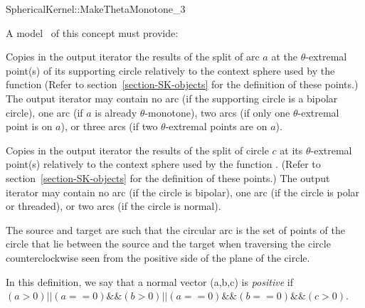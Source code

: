 {\color{cyan} %
\begin{ccRefFunctionObjectConcept}{SphericalKernel::MakeThetaMonotone_3}


A model \ccVar\ of this concept must provide:


{
Copies in the output iterator the results of the split of arc $a$ at the $\theta$-extremal
point(s) of its supporting circle relatively to {\color{magenta} the context sphere used by the function } %
(Refer to section~\ref{section-SK-objects} for the definition of these points.)
The output iterator may contain no arc (if the supporting circle is a bipolar circle),
one arc (if $a$ is already $\theta$-monotone), two arcs (if only one $\theta$-extremal point is on $a$), or
three arcs (if two $\theta$-extremal points are on $a$).
}


{Copies in the output iterator the results of the split of circle $c$ at its $\theta$-extremal
point(s) relatively to {\color{magenta} the context sphere used by the function .} %
(Refer to section~\ref{section-SK-objects} for the definition of these points.)
The output iterator may contain no arc (if the circle is bipolar),
one arc (if the circle is polar or threaded), or two arcs (if the circle is normal).

The source and target are such that
the circular arc is the set of points of the circle that lie between the source 
and the target when traversing the circle counterclockwise
seen from the positive side of the plane of the circle.

In this definition, we say that a normal vector (a,b,c) is \textit{positive} if 
$(a>0) || (a==0) \&\& (b>0) || (a==0)\&\&(b==0)\&\&(c>0)$.


}
\end{ccRefFunctionObjectConcept}}
